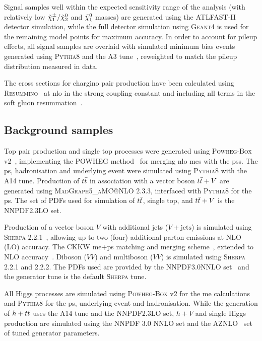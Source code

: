 Signal samples well within the expected sensitivity range of the analysis (with relatively low $\tilde{\chi}_1^\pm/\tilde{\chi}_2^0$ and $\tilde{\chi}_1^0$ masses) are generated using the \textsc{ATLFAST-II} detector simulation, while the full detector simulation using \textsc{Geant4} is used for the remaining model points for maximum accuracy. In order to account for pileup effects, all signal samples are overlaid with simulated minimum bias events generated using \textsc{Pythia8} and the A3 tune~\cite{ATL-PHYS-PUB-2016-017}, reweighted to match the pileup distribution measured in data. 

The cross sections for chargino pair production have been calculated using \textsc{Resummino}~\cite{Fuks:2013vua} at \gls{nlo} in the strong coupling constant and including \gls{nll} terms in the soft gluon resummation~\cite{Fiaschi:2018hgm,Fuks:2012qx}.

\subsection{Background samples}

Top pair production and single top processes were generated using \textsc{Powheg-Box} v2~\cite{PowhegBox:2010xd}, implementing the \textsc{POWHEG} method~\cite{Powheg1,Powheg2} for merging \gls{nlo} \glspl{me} with the \glspl{ps}. The \gls{ps}, hadronisation and underlying event were simulated using \textsc{Pythia8} with the A14 tune. Production of $t\bar{t}$ in association with a vector boson $t\bar{t}+V$ are generated using \textsc{MadGraph5\_aMC@NLO} 2.3.3, interfaced with \textsc{Pythia8} for the \gls{ps}. The set of \glspl{PDF} used for simulation of $t\bar{t}$, single top, and $t\bar{t}+V$ is the NNPDF2.3LO set.

Production of a vector boson $V$ with additional jets ($V+\mathrm{jets}$) is simulated using \textsc{Sherpa} 2.2.1~\cite{Gleisberg:2008ta,Bothmann:2019yzt}, allowing up to two (four) additional parton emissions at NLO (LO) accuracy. The CKKW \gls{me}+\gls{ps} matching and merging scheme~\cite{Hoeche:2009rj,Catani:2001cc}, extended to NLO accuracy~\cite{Hoeche:2012yf}. Diboson ($VV$) and multiboson ($VV$) is simulated using \textsc{Sherpa} 2.2.1 and 2.2.2. The \glspl{PDF} used are provided by the NNPDF3.0NNLO set~\cite{Ball:2014uwa} and the generator tune is the default \textsc{Sherpa} tune.

All Higgs processes are simulated using \textsc{Powheg-Box} v2 for the \gls{me} calculations and \textsc{Pythia8} for the \gls{ps}, underlying event and hadronisation. While the generation of $h+t\bar{t}$ uses the A14 tune and the NNPDF2.3LO set, $h+V$ and single Higgs production are simulated using the NNPDF 3.0 NNLO set and the AZNLO~\cite{ATL-PHYS-PUB-2013-017} set of tuned generator parameters.

